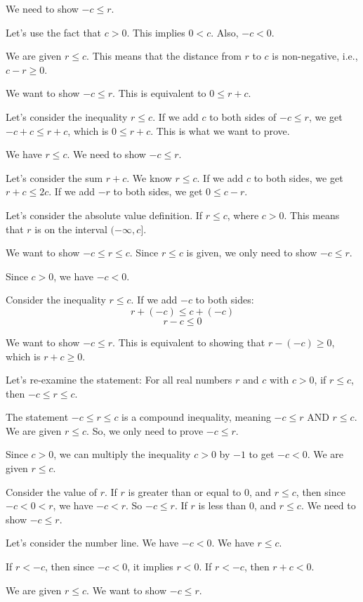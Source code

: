 \documentclass{article}
\begin{document}
We need to show $-c \le r$.

Let's use the fact that $c > 0$.
This implies $0 < c$.
Also, $-c < 0$.

We are given $r \le c$.
This means that the distance from $r$ to $c$ is non-negative, i.e., $c-r \ge 0$.

We want to show $-c \le r$.
This is equivalent to $0 \le r + c$.

Let's consider the inequality $r \le c$.
If we add $c$ to both sides of $-c \le r$, we get $-c+c \le r+c$, which is $0 \le r+c$. This is what we want to prove.

We have $r \le c$.
We need to show $-c \le r$.

Let's consider the sum $r+c$.
We know $r \le c$.
If we add $c$ to both sides, we get $r+c \le 2c$.
If we add $-r$ to both sides, we get $0 \le c-r$.

Let's consider the absolute value definition.
If $r \le c$, where $c > 0$.
This means that $r$ is on the interval $(-\infty, c]$.

We want to show $-c \le r \le c$.
Since $r \le c$ is given, we only need to show $-c \le r$.

Since $c > 0$, we have $-c < 0$.

Consider the inequality $r \le c$.
If we add $-c$ to both sides:
$$ r + (-c) \le c + (-c) $$
$$ r - c \le 0 $$

We want to show $-c \le r$.
This is equivalent to showing that $r - (-c) \ge 0$, which is $r+c \ge 0$.

Let's re-examine the statement: For all real numbers $r$ and $c$ with $c > 0$, if $r \le c$, then $-c \le r \le c$.

The statement $-c \le r \le c$ is a compound inequality, meaning $-c \le r$ AND $r \le c$.
We are given $r \le c$. So, we only need to prove $-c \le r$.

Since $c > 0$, we can multiply the inequality $c > 0$ by $-1$ to get $-c < 0$.
We are given $r \le c$.

Consider the value of $r$.
If $r$ is greater than or equal to 0, and $r \le c$, then since $-c < 0 < r$, we have $-c < r$. So $-c \le r$.
If $r$ is less than 0, and $r \le c$.
We need to show $-c \le r$.

Let's consider the number line.
We have $-c < 0$.
We have $r \le c$.

If $r < -c$, then since $-c < 0$, it implies $r < 0$.
If $r < -c$, then $r+c < 0$.

We are given $r \le c$.
We want to show $-c \le r$.
\end{document}

